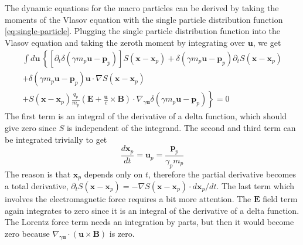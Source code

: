 The dynamic equations for the macro particles can be derived by taking
the moments of the Vlasov equation with the single particle
distribution function \eqref{eq:single-particle}. Plugging the single
particle distribution function into the Vlasov equation and taking the
zeroth moment by integrating over $\mathbf{u}$, we get
\begin{equation}
  \begin{split}
    \int d\mathbf{u}\,\left\{ \left[ \partial_t \delta(\gamma m_{p}\mathbf{u} - \mathbf{p}_p) \right]S(\mathbf{x} - \mathbf{x}_p) + \delta(\gamma m_{p}\mathbf{u} - \mathbf{p}_p)\partial_tS(\mathbf{x} - \mathbf{x}_p) \right. \\
    + \delta(\gamma m_{p}\mathbf{u} - \mathbf{p}_p) \mathbf{u}\cdot\nabla S(\mathbf{x} - \mathbf{x}_p) \\
    \left. + S(\mathbf{x} - \mathbf{x}_p)\frac{q_p}{m_p}\left(\mathbf{E} +
        \frac{\mathbf{u}}{c}\times \mathbf{B}\right)\cdot \nabla_{\gamma
        \mathbf{u}}\delta(\gamma m_{p}\mathbf{u} - \mathbf{p}_p) \right\} = 0
  \end{split}
\end{equation}
The first term is an integral of the derivative of a delta function,
which should give zero since $S$ is independent of the integrand. The
second and third term can be integrated trivially to get
\begin{equation}
  \label{eq:eom-position}
\frac{d\mathbf{x}_p}{dt} = \mathbf{u}_p = \frac{\mathbf{p}_p}{\gamma_p m_{p}}
\end{equation}
The reason is that $\mathbf{x}_p$ depends only on $t$, therefore
the partial derivative becomes a total derivative,
$\partial_tS(\mathbf{x} - \mathbf{x}_p) = -\nabla
S(\mathbf{x} - \mathbf{x}_p) \cdot d\mathbf{x}_p/dt$. The
last term which involves the electromagnetic force requires a bit more
attention. The $\mathbf{E}$ field term again integrates to zero
since it is an integral of the derivative of a delta function. The
Lorentz force term needs an integration by parts, but then it would
become zero because $\nabla_{\gamma
  \mathbf{u}}\cdot(\mathbf{u}\times \mathbf{B})$ is zero.


